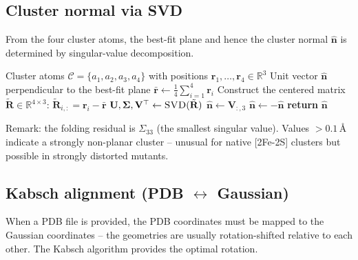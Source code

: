 \documentclass[11pt,a4paper,twoside]{article}
\providecommand{\angstrom}{\text{\AA}}    %
\theoremstyle{remark}
\begin{document}
\subsection{Cluster normal via SVD}
\label{app:pseudo-svd}

From the four cluster atoms, the best-fit plane and hence the
cluster normal $\hat{\mathbf{n}}$ is determined by singular-value
decomposition.

\begin{algorithm}[H]
\caption{\textsc{ClusterNormal}}
\begin{algorithmic}[1]
\Require Cluster atoms $\mathcal{C} = \{a_1, a_2, a_3, a_4\}$
        with positions
        $\mathbf{r}_1, \ldots, \mathbf{r}_4 \in \mathbb{R}^3$
\Ensure Unit vector $\hat{\mathbf{n}}$ perpendicular to the
        best-fit plane
\State $\bar{\mathbf{r}} \gets \frac{1}{4} \sum_{i=1}^{4} \mathbf{r}_i$
\State Construct the centered matrix
       $\tilde{\mathbf{R}} \in \mathbb{R}^{4\times 3}$:
       $\tilde{\mathbf{R}}_{i,:} = \mathbf{r}_i - \bar{\mathbf{r}}$
\State $\mathbf{U}, \boldsymbol{\Sigma}, \mathbf{V}^\top \gets
       \textsc{SVD}(\tilde{\mathbf{R}})$
\State $\hat{\mathbf{n}} \gets \mathbf{V}_{:,3}$
  
  \State $\hat{\mathbf{n}} \gets -\hat{\mathbf{n}}$
\EndIf
\State \textbf{return} $\hat{\mathbf{n}}$
\end{algorithmic}
\end{algorithm}

Remark: the folding residual is $\Sigma_{33}$ (the smallest
singular value). Values $> 0.1\,\angstrom$ indicate a strongly
non-planar cluster -- unusual for native [2Fe-2S] clusters but
possible in strongly distorted mutants.

\subsection{Kabsch alignment (PDB $\leftrightarrow$ Gaussian)}
\label{app:pseudo-kabsch}

When a PDB file is provided, the PDB coordinates must be mapped to
the Gaussian coordinates -- the geometries are usually
rotation-shifted relative to each other. The Kabsch algorithm
\cite{Kabsch1976} provides the optimal rotation.
\end{document}
